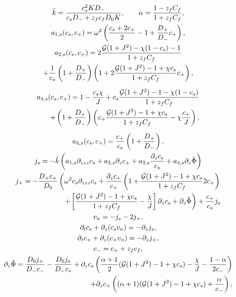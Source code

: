 \documentclass[12pt]{extarticle}
\begin{document}
\begin{gather}
\tilde{k}=\frac{c^2_sKD_-}{c_sD_-+z_fc_fD_0K},\qquad \alpha=\frac{1-z_fC_f}{1+z_fC_f},\\
a_{1,s}(c_s,c_+)=\omega^2\left(\frac{c_s+2c_+}{2}-1+\frac{D_+}{D_-}c_+\right),\\
\scriptsize
a_{2,s}(c_s,c_+)=2\frac{\mathcal{G}(1+J^2)-\chi(1-c_s)-1}{1+z_fC_f}\\
+\frac{1}{c_s}\left(1+\frac{D_+}{D_-}\right)\left(1+2\frac{\mathcal{G}(1+J^2)-1+\chi c_s}{1+z_fC_f}c_+\right),\\[2mm]
\begin{aligned}
a_{3,s}(c_s,c_+)=1-\frac{c_s\chi}{J}+c_s\frac{\mathcal{G}(1+J^2)-1-\chi(1-c_s)}{1+z_fC_f}\\
+\left(1+\frac{D_+}{D_-}\right)\left(c_+\frac{\mathcal{G}(1+J^2)-1+\chi c_s}{1+z_fC_f}-\chi\frac{c_+}{J}\right),
\end{aligned}\\[2mm]
a_{4,s}(c_s,c_+)=\frac{c_+}{c_s}\left(1+\frac{D_+}{D_-}\right),\\
j_s =- \tilde{k} \left(a_{1,s}\partial_{zzz}c_s +a_{2,s}\partial_z c_++a_{3,s}\frac{\partial_z c_s}{c_s}+a_{4,s}\partial_z\tilde{\Phi}\right)\\
\begin{aligned}
j_+= - \frac{D_+ c_+}{D_0}\left(\omega^2c_s\partial_{zzz}c_s+\frac{\partial_zc_+}{c_+}\left(1+\frac{\mathcal{G}(1+J^2)-1+\chi c_s}{1+z_fC_f}2c_+\right)\right.
\\\left.+ \left[\frac{\mathcal{G}(1+J^2)-1+\chi c_s}{1+z_fC_f}-\frac{\chi}{J}\right]\partial_zc_s+\partial_z\tilde{\Phi}\right) +\frac{c_+}{c_s}j_s
\end{aligned}\\
v_n = - j_s-2j_+,\\
\partial_t c_s + \partial_z (c_s v_n)=- \partial_z j_s,\\
\partial_t c_+ +\partial_z (c_+ v_n)= -\partial_zj_+,\\
c_-=c_++z_fc_f,\\
\begin{aligned}
\partial_z \tilde{\Phi} = \frac{D_0 j_+}{D_-c_-}- \frac{D_0 j_s}{D_-c_s} + \partial_z c_s\left(\frac{\alpha+1}{2}(\mathcal{G}(1+J^2)-1+\chi c_s)-\frac{\chi}{J}-\frac{1-\alpha}{2c_-}\right)\\
+\partial_z c_+\left((\alpha+1)(\mathcal{G}(1+J^2)-1+\chi c_s)+\frac{\alpha}{c_-}\right),
\end{aligned}
\end{gather}
\end{document}

